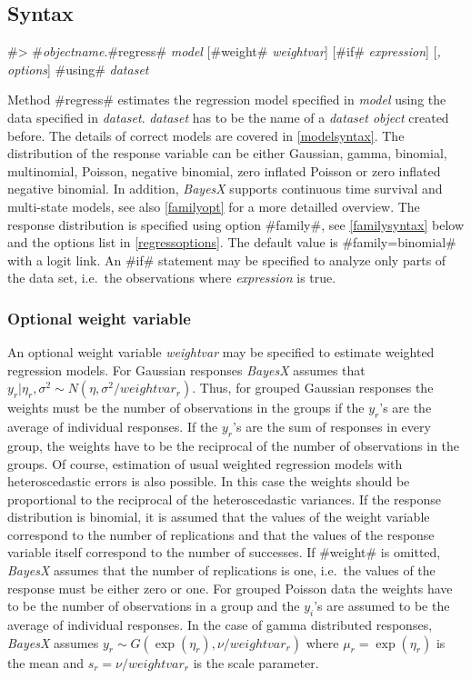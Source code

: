 \subsection{Syntax}
\label{bayesregregresssyntax}

 #> #{\em objectname}.#regress# {\em model} [#weight# {\em weightvar}] [#if# {\em expression}] [{\em , options}] #using# {\em dataset}

Method #regress# estimates the regression model specified in {\em
model} using the data specified in {\em dataset}. {\em dataset}
has to be the name of a {\em dataset object} created before. The
details of correct models are covered in \autoref{modelsyntax}.
The distribution of the response variable can be either Gaussian,
gamma, binomial, multinomial, Poisson, negative binomial, zero
inflated Poisson or zero inflated negative binomial. In addition,
{\em BayesX} supports continuous time survival and multi-state
models, see also \autoref{familyopt} for a more detailled
overview. The response distribution is specified using option
#family#, see \autoref{familysyntax} below and the options list in
\autoref{regressoptions}. The default value is #family=binomial#
with a logit link. An #if# statement may be specified to analyze
only parts of the data set, i.e.~the observations where {\em
expression} is true.

\subsubsection{Optional weight variable}
\label{weightspecification}

An optional weight variable {\em weightvar} may be specified to
estimate weighted regression models. For Gaussian responses {\em
BayesX} assumes that $y_r|\eta_r,\sigma^2 \sim
N(\eta,\sigma^2/weightvar_r)$. Thus, for grouped Gaussian
responses the weights must be the number of observations in the
groups if the $y_r$'s are the average of individual responses. If
the $y_r$'s are the sum of responses in every group, the weights
have to be the reciprocal of the number of observations in the
groups. Of course, estimation of usual weighted regression models
with heteroscedastic errors is also possible. In this case the
weights should be proportional to the reciprocal of the
heteroscedastic variances. If the response distribution is
binomial, it is assumed that the values of the weight variable
correspond to the number of replications and that the values of
the response variable itself correspond to the number of
successes. If #weight# is omitted, {\em BayesX} assumes that the
number of replications is one, i.e.~the values of the response
must be either zero or one. For grouped Poisson data the weights
have to be the number of observations in a group and the $y_i$'s
are assumed to be the average of individual responses. In the case
of gamma distributed responses, {\em BayesX} assumes $y_r \sim
G(\exp(\eta_r),\nu/weightvar_r)$ where $\mu_r= \exp(\eta_r)$ is
the mean and $s_r = \nu/weightvar_r$ is the scale parameter.

